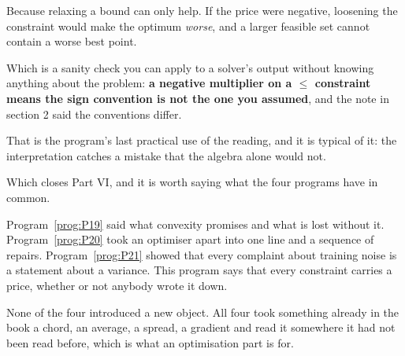 \begin{fr}
\begin{ansblock}
Because relaxing a bound can only help. If the price were negative, loosening
the constraint would make the optimum \emph{worse}, and a larger feasible set
cannot contain a worse best point.
\end{ansblock}

Which is a sanity check you can apply to a solver's output without knowing
anything about the problem: \textbf{a negative multiplier on a $\le$
constraint means the sign convention is not the one you assumed}, and the
note in section 2 said the conventions differ.

That is the program's last practical use of the reading, and it is typical of
it: the interpretation catches a mistake that the algebra alone would not.
\end{fr}

\begin{fr}
Which closes Part VI, and it is worth saying what the four programs have in
common.

Program~\ref{prog:P19} said what convexity promises and what is lost without
it. Program~\ref{prog:P20} took an optimiser apart into one line and a sequence
of repairs. Program~\ref{prog:P21} showed that every complaint about training
noise is a statement about a variance. This program says that every constraint
carries a price, whether or not anybody wrote it down.

None of the four introduced a new object. All four took something already in
the book \dash{} a chord, an average, a spread, a gradient \dash{} and read it
somewhere it had not been read before, which is what an optimisation part is
for.
\end{fr}


